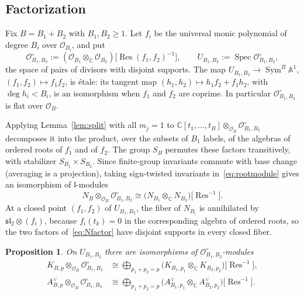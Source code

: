\documentclass[11pt]{amsart}
\numberwithin{equation}{section}
\newtheorem{proposition}[theorem]{Proposition}
\theoremstyle{definition}
\theoremstyle{remark}
\newcommand{\C}{\mathbb{C}}
\newcommand{\A}{\mathbb{A}}
\newcommand{\sltwo}{\mathfrak{sl}_2}
\newcommand{\lie}{\mathfrak{l}}
\newcommand{\cO}{\mathcal{O}}
\newcommand{\Sym}{\operatorname{Sym}}
\newcommand{\Spec}{\operatorname{Spec}}
\newcommand{\Res}{\operatorname{Res}}
\begin{document}
\subsection{Factorization}
Fix $B=B_1+B_2$ with $B_1,B_2\ge1$. Let $f_i$ be the universal monic polynomial of degree $B_i$ over $\cO_{B_i}$, and put
\begin{equation}\label{eq:chart}
\cO^\circ_{B_1,B_2}:=(\cO_{B_1}\otimes_\C\cO_{B_2})\bigl[\Res(f_1,f_2)^{-1}\bigr],\qquad U_{B_1,B_2}:=\Spec\cO^\circ_{B_1,B_2},
\end{equation}
the space of pairs of divisors with disjoint supports. The map $U_{B_1,B_2}\to\Sym^B\A^1$, $(f_1,f_2)\mapsto f_1f_2$, is \'etale: its tangent map $(h_1,h_2)\mapsto h_1f_2+f_1h_2$, with $\deg h_i<B_i$, is an isomorphism when $f_1$ and $f_2$ are coprime. In particular $\cO^\circ_{B_1,B_2}$ is flat over $\cO_B$.

Applying Lemma~\ref{lem:split} with all $m_j=1$ to $\C[t_1,\dots,t_B]\otimes_{\cO_B}\cO^\circ_{B_1,B_2}$ decomposes it into the product, over the subsets of $B_1$ labels, of the algebras of ordered roots of $f_1$ and of $f_2$. The group $S_B$ permutes these factors transitively, with stabilizer $S_{B_1}\times S_{B_2}$. Since finite-group invariants commute with base change (averaging is a projection), taking sign-twisted invariants in~\eqref{eq:rootmodule} gives an isomorphism of $\lie$-modules
\begin{equation}\label{eq:Nfactor}
N_B\otimes_{\cO_B}\cO^\circ_{B_1,B_2}\cong\bigl(N_{B_1}\otimes_\C N_{B_2}\bigr)\bigl[\Res^{-1}\bigr].
\end{equation}
At a closed point $(f_1,f_2)$ of $U_{B_1,B_2}$, the fiber of $N_{B_i}$ is annihilated by $\sltwo\otimes(f_i)$, because $f_i(t_k)=0$ in the corresponding algebra of ordered roots, so the two factors of~\eqref{eq:Nfactor} have disjoint supports in every closed fiber.

\begin{proposition}\label{prop:factor}
On $U_{B_1,B_2}$ there are isomorphisms of $\cO^\circ_{B_1,B_2}$-modules
\begin{align}
K_{B,p}\otimes_{\cO_B}\cO^\circ_{B_1,B_2}&\cong\bigoplus_{p_1+p_2=p}\bigl(K_{B_1,p_1}\otimes_\C K_{B_2,p_2}\bigr)\bigl[\Res^{-1}\bigr],\label{eq:Kfactor}\\
A^\vee_{B,p}\otimes_{\cO_B}\cO^\circ_{B_1,B_2}&\cong\bigoplus_{p_1+p_2=p}\bigl(A^\vee_{B_1,p_1}\otimes_\C A^\vee_{B_2,p_2}\bigr)\bigl[\Res^{-1}\bigr].\label{eq:Afactor}
\end{align}
\end{proposition}
\end{document}
